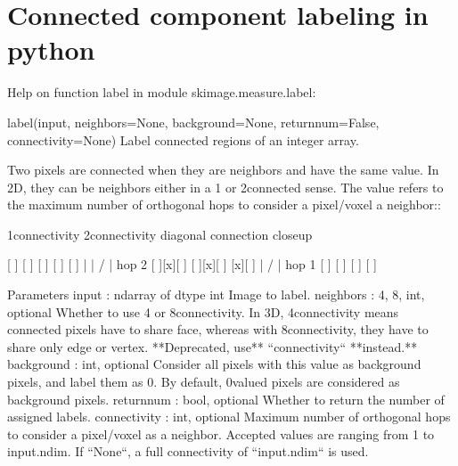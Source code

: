 \documentclass[letterpaper,10pt,english]{sphinxmanual}
\begin{document}
\noindent{}


\section{Connected component labeling in python}
\label{\detokenize{06-ShapeAnalysis:connected-component-labeling-in-python}}
\begin{sphinxVerbatim}[commandchars=\\\{\}]
   
\end{sphinxVerbatim}

\begin{sphinxVerbatim}[commandchars=\\\{\}]
Help on function label in module skimage.measure.\PYGZus{}label:

label(input, neighbors=None, background=None, return\PYGZus{}num=False, connectivity=None)
    Label connected regions of an integer array.
    
    Two pixels are connected when they are neighbors and have the same value.
    In 2D, they can be neighbors either in a 1\PYGZhy{} or 2\PYGZhy{}connected sense.
    The value refers to the maximum number of orthogonal hops to consider a
    pixel/voxel a neighbor::
    
      1\PYGZhy{}connectivity     2\PYGZhy{}connectivity     diagonal connection close\PYGZhy{}up
    
           [ ]           [ ]  [ ]  [ ]             [ ]
            |               \PYGZbs{}  |  /                 |  \PYGZlt{}\PYGZhy{} hop 2
      [ ]\PYGZhy{}\PYGZhy{}[x]\PYGZhy{}\PYGZhy{}[ ]      [ ]\PYGZhy{}\PYGZhy{}[x]\PYGZhy{}\PYGZhy{}[ ]        [x]\PYGZhy{}\PYGZhy{}[ ]
            |               /  |  \PYGZbs{}             hop 1
           [ ]           [ ]  [ ]  [ ]
    
    Parameters
    \PYGZhy{}\PYGZhy{}\PYGZhy{}\PYGZhy{}\PYGZhy{}\PYGZhy{}\PYGZhy{}\PYGZhy{}\PYGZhy{}\PYGZhy{}
    input : ndarray of dtype int
        Image to label.
    neighbors : \PYGZob{}4, 8\PYGZcb{}, int, optional
        Whether to use 4\PYGZhy{} or 8\PYGZhy{}\PYGZdq{}connectivity\PYGZdq{}.
        In 3D, 4\PYGZhy{}\PYGZdq{}connectivity\PYGZdq{} means connected pixels have to share face,
        whereas with 8\PYGZhy{}\PYGZdq{}connectivity\PYGZdq{}, they have to share only edge or vertex.
        **Deprecated, use** ``connectivity`` **instead.**
    background : int, optional
        Consider all pixels with this value as background pixels, and label
        them as 0. By default, 0\PYGZhy{}valued pixels are considered as background
        pixels.
    return\PYGZus{}num : bool, optional
        Whether to return the number of assigned labels.
    connectivity : int, optional
        Maximum number of orthogonal hops to consider a pixel/voxel
        as a neighbor.
        Accepted values are ranging from  1 to input.ndim. If ``None``, a full
        connectivity of ``input.ndim`` is used.
    

\end{sphinxVerbatim}
\end{document}

